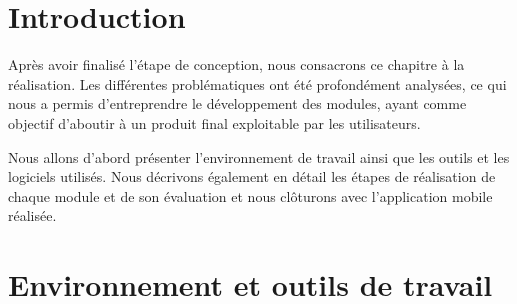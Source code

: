 
\section{Introduction}
Après avoir finalisé l'étape de conception, nous consacrons ce chapitre à la réalisation. Les différentes problématiques ont été profondément analysées, ce qui nous a permis d'entreprendre le développement des modules, ayant comme objectif d'aboutir à un produit final exploitable par les utilisateurs.

Nous allons d'abord présenter l'environnement de travail ainsi que les outils et les logiciels utilisés. Nous décrivons également en détail les étapes de réalisation de chaque module et de son évaluation et nous clôturons avec l'application mobile réalisée.

\newpage
\section{Environnement et outils de travail}
